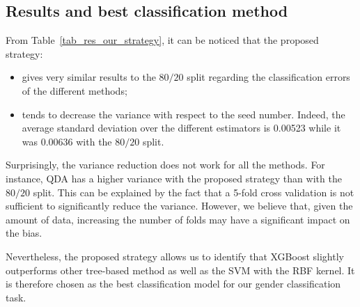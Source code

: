 \subsection{Results and best classification method}
From Table~\ref{tab_res_our_strategy}, it can be noticed that the proposed strategy:
\begin{itemize}
	\item gives very similar results to the $80/20$ split regarding the classification errors of the different methods;
 	\item tends to decrease the variance with respect to the seed number. Indeed, the average standard deviation over the different estimators is \num{0.00523} while it was \num{0.00636} with the $80/20$ split.
\end{itemize} 

Surprisingly, the variance reduction does not work for all the methods. For instance, QDA has a higher variance with the proposed strategy than with the $80/20$ split. 
This can be explained by the fact that a \num{5}-fold cross validation is not sufficient to significantly reduce the variance. However, we believe that, given the amount of data, increasing the number of folds may have a significant impact on the bias. 

Nevertheless, the proposed strategy allows us to identify that XGBoost slightly outperforms other tree-based method as well as the SVM with the RBF kernel. It is therefore chosen as the best classification model for our gender classification task. 